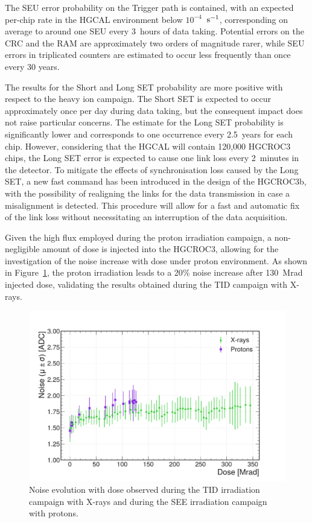 The SEU error probability on the Trigger path is contained, with an expected per-chip rate in the HGCAL environment below $10^{-4}$~$\textnormal{s}^{-1}$, corresponding on average to around one SEU every 3~hours of data taking.
Potential errors on the CRC and the RAM are approximately two orders of magnitude rarer, while SEU errors in triplicated counters are estimated to occur less frequently than once every 30 years.

The results for the Short and Long SET probability are more positive with respect to the heavy ion campaign. The Short SET is expected to occur approximately once per day during data taking, but the consequent impact does not raise particular concerns.
The estimate for the Long SET probability is significantly lower and corresponds to one occurrence every 2.5~years for each chip. However, considering that the HGCAL will contain 120,000 HGCROC3 chips, the Long SET error is expected to cause one link loss every 2~minutes in the detector.
To mitigate the effects of synchronisation loss caused by the Long SET, a new fast command has been introduced in the design of the HGCROC3b, with the possibility of realigning the links for the data transmission in case a misalignment is detected. This procedure will allow for a fast and automatic fix of the link loss without necessitating an interruption of the data acquisition.

\bigbreak

Given the high flux employed during the proton irradiation campaign, a non-negligible amount of dose is injected into the HGCROC3, allowing for the investigation of the noise increase with dose under proton environment. As shown in Figure~\ref{fig:NoiseEvolution}, the proton irradiation leads to a 20$\%$ noise increase after 130~Mrad injected dose, validating the results obtained during the TID campaign with X-rays.

\begin{figure}
    \centering
    \includegraphics[width=0.7\linewidth]{Figures/HGCAL/NoiseEvolution.pdf}
    \caption{Noise evolution with dose observed during the TID irradiation campaign with X-rays and during the SEE irradiation campaign with protons.}
    \label{fig:NoiseEvolution}
\end{figure}

